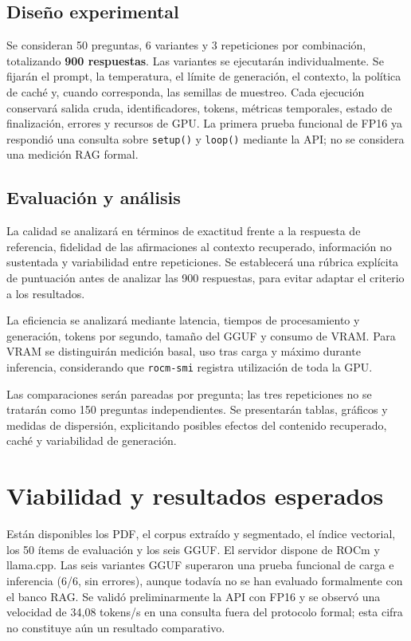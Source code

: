 \documentclass[11pt,a4paper]{article}
\begin{document}
\subsection{Diseño experimental}
Se consideran 50 preguntas, 6 variantes y 3 repeticiones por combinación, totalizando \textbf{900 respuestas}. Las variantes se ejecutarán individualmente. Se fijarán el prompt, la temperatura, el límite de generación, el contexto, la política de caché y, cuando corresponda, las semillas de muestreo. Cada ejecución conservará salida cruda, identificadores, tokens, métricas temporales, estado de finalización, errores y recursos de GPU. La primera prueba funcional de FP16 ya respondió una consulta sobre \texttt{setup()} y \texttt{loop()} mediante la API; no se considera una medición RAG formal.

\subsection{Evaluación y análisis}
La calidad se analizará en términos de exactitud frente a la respuesta de referencia, fidelidad de las afirmaciones al contexto recuperado, información no sustentada y variabilidad entre repeticiones. Se establecerá una rúbrica explícita de puntuación antes de analizar las 900 respuestas, para evitar adaptar el criterio a los resultados.

La eficiencia se analizará mediante latencia, tiempos de procesamiento y generación, tokens por segundo, tamaño del GGUF y consumo de VRAM. Para VRAM se distinguirán medición basal, uso tras carga y máximo durante inferencia, considerando que \texttt{rocm-smi} registra utilización de toda la GPU.

Las comparaciones serán pareadas por pregunta; las tres repeticiones no se tratarán como 150 preguntas independientes. Se presentarán tablas, gráficos y medidas de dispersión, explicitando posibles efectos del contenido recuperado, caché y variabilidad de generación.

\section{Viabilidad y resultados esperados}
Están disponibles los PDF, el corpus extraído y segmentado, el índice vectorial, los 50 ítems de evaluación y los seis GGUF. El servidor dispone de ROCm y llama.cpp. Las seis variantes GGUF superaron una prueba funcional de carga e inferencia (6/6, sin errores), aunque todavía no se han evaluado formalmente con el banco RAG. Se validó preliminarmente la API con FP16 y se observó una velocidad de 34,08 tokens/s en una consulta fuera del protocolo formal; esta cifra no constituye aún un resultado comparativo.
\end{document}
